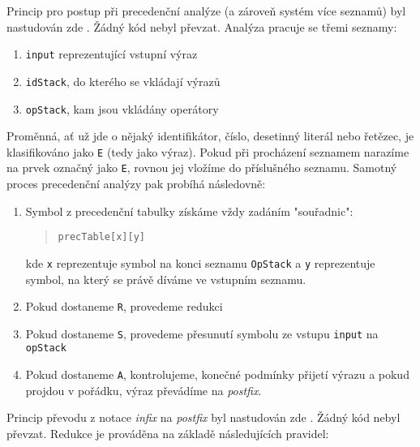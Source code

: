 \documentclass[czech,a4paper,12pt]{article}[]
\begin{document}
Princip pro postup při precedenční analýze (a zároveň systém více seznamů) byl nastudován zde \cite{prectable}. Žádný kód nebyl převzat. Analýza pracuje se třemi seznamy:

\begin{enumerate}
    \item \texttt{input} reprezentující vstupní výraz
    \item \texttt{idStack}, do kterého se vkládají výrazů
    \item \texttt{opStack}, kam jsou vkládány operátory
\end{enumerate} 

\medskip
Proměnná, ať už jde o nějaký identifikátor, číslo, desetinný literál nebo řetězec, je klasifikováno jako \texttt{E} (tedy jako výraz). Pokud při procházení seznamem narazíme na prvek označný jako \texttt{E}, rovnou jej vložíme do příslušného seznamu. Samotný proces precedenční analýzy pak probíhá následovně:

\begin{enumerate}
\item Symbol z precedenční tabulky získáme vždy zadáním "souřadnic":
\begin{quote}
\texttt{precTable[x][y]}
\end{quote}
kde \texttt{x} reprezentuje symbol na konci seznamu \texttt{OpStack} a \texttt{y} reprezentuje symbol, na který se právě díváme ve vstupním seznamu.
\item Pokud dostaneme \texttt{R}, provedeme redukci
\item Pokud dostaneme \texttt{S}, provedeme přesunutí symbolu ze vstupu \texttt{input} na \texttt{opStack}
\item Pokud dostaneme \texttt{A}, kontrolujeme, konečné podmínky přijetí výrazu a pokud projdou v pořádku, výraz převádíme na \emph{postfix}.
\end{enumerate}

Princip převodu z notace \emph{infix} na \emph{postfix} byl nastudován zde \cite{postfix}. Žádný kód nebyl převzat.
\medskip
Redukce je prováděna na základě následujících pravidel:

\begin{center}
\end{center}
\end{document}
